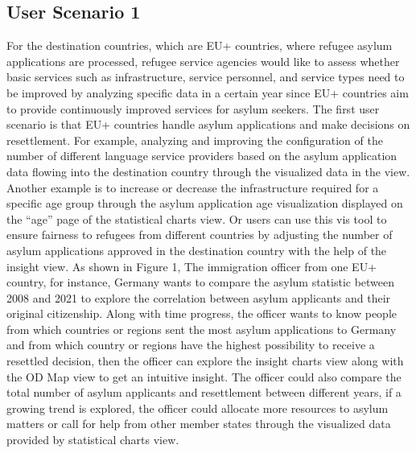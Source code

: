 \documentclass[journal]{vgtc}                %
\begin{document}
 \subsection{User Scenario 1}
 For the destination countries, which are EU+ countries, where refugee asylum applications are processed, refugee service agencies would like to assess whether basic services such as infrastructure, service personnel, and service types need to be improved by analyzing specific data in a certain year since EU+ countries aim to provide continuously improved services for asylum seekers. The first user scenario is that EU+ countries handle asylum applications and make decisions on resettlement. For example, analyzing and improving the configuration of the number of different language service providers based on the asylum application data flowing into the destination country through the visualized data in the view. Another example is to increase or decrease the infrastructure required for a specific age group through the asylum application age visualization displayed on the “age” page of the statistical charts view. Or users can use this vis tool to ensure fairness to refugees from different countries by adjusting the number of asylum applications approved in the destination country with the help of the insight view. 
 As shown in Figure 1, The immigration officer from one EU+ country, for instance, Germany wants to compare the asylum statistic between 2008 and 2021 to explore the correlation between asylum applicants and their original citizenship. Along with time progress, the officer wants to know people from which countries or regions sent the most asylum applications to Germany and from which country or regions have the highest possibility to receive a resettled decision, then the officer can explore the insight charts view along with the OD Map view to get an intuitive insight. The officer could also compare the total number of asylum applicants and resettlement between different years, if a growing trend is explored, the officer could allocate more resources to asylum matters or call for help from other member states through the visualized data provided by statistical charts view.
\end{document}
